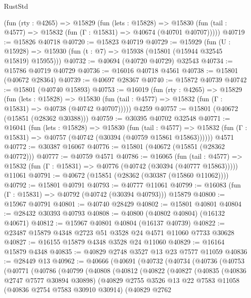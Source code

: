 \begin{lexlean}{RustStd}
\begin{coremodule}
    (fun (rty : @4265) =>
    @15829
      (fun (lets : @15828) =>
      @15830 (fun (tail : @4577) => @15832 (fun (Γ : @15831) => @40674 (@40701 @40707)))))
@40719 := @15826 @40718
@40720 := @15823 @40719
@40729 := @15929
    (fun (U : @15928) => @15930 (fun (t : @7) => @15938 (@15801 (@15944 @32545 @15819) @15955)))
@40732 := @40694 (@40720 @40729) @32543
@40734 := @15786 @40719 @40729
@40736 := @16016 @40718 @4561
@40738 := @15801 (@40672 @28364)
@40739 := @40697 @28367
@40740 := @15872 @40739
@40742 := @15801 (@40740 @15893)
@40753 := @16019
    (fun (rty : @4265) =>
    @15829
      (fun (lets : @15828) =>
      @15830 (fun (tail : @4577) => @15832 (fun (Γ : @15831) => @40738 (@40742 @40707)))))
    @4259
@40757 := @15801 (@40672 (@15851 (@28362 @30388)))
@40759 := @30395 @40702 @32548
@40771 := @16041
    (fun (lets : @15828) =>
    @15830
      (fun (tail : @4577) =>
      @15832 (fun (Γ : @15831) => @40757 (@40742 (@30394 (@40759 @15861 @15863))))))
    @4571
@40772 := @30387 @16067
@40776 := @15801 (@40672 (@15851 (@28362 @40772)))
@40777 := @40759 @4571
@40786 := @16065
    (fun (tail : @4577) => @15832 (fun (Γ : @15831) => @40776 (@40742 (@30394 (@40777 @15863)))))
    @11061
@40791 := @40672 (@15851 (@28362 (@30387 (@15860 @11062))))
@40792 := @15801 @40791
@40793 := @40777 @11061
@40799 := @16083 (fun (Γ : @15831) => @40792 (@40742 (@30394 @40793))) @15879
@40800 := @15967 @40791
@40801 := @40740 @28429
@40802 := @15801 @40801
@40804 := @28432 @30393 @40793
@40808 := @40800 (@40802 @40804) (@16132 @40671)
@40812 := @15967 @40801 @40804 (@16137 @40739)
@40822 := @23487 @15879 @4348 @2723 @51 @3528 @24 @4571 @11060 @7733 @30628
@40827 := @16155 @15879 @4348 @3528 @24 @11060
@40829 := @16164 @15879 @4348
@40835 := @40829 @2748 @3527 @13 @23 @7577 @11059
@40836 := @28449 @13
@40962 := @40666
    (@40691
      (@40732
        (@40734
          (@40736
            (@40753
              (@40771
                (@40786
                  (@40799
                    (@40808
                      (@40812
                        (@40822
                          (@40827
                            (@40835
                              (@40836 @2747 @7577 @30894 @30898)
                              (@40829
                                @2755
                                @3526
                                @13
                                @22
                                @7583
                                @11058
                                (@40836 @2754 @7583 @30910 @30914)
                                (@40829
                                  @2762

\end{coremodule}
\end{lexlean}
